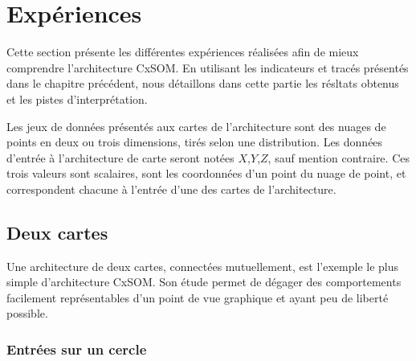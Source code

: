 \chapter{Expériences}
\graphicspath{{04-Analyse/}}

Cette section présente les différentes expériences réalisées afin de mieux comprendre l'architecture CxSOM.
En utilisant les indicateurs et tracés présentés dans le chapitre précédent, nous détaillons dans cette partie les résltats obtenus et les pistes d'interprétation.

Les jeux de données présentés aux cartes de l'architecture sont des nuages de points en deux ou trois dimensions, tirés selon une distribution.
Les données d'entrée à l'architecture de carte seront notées $X$,$Y$,$Z$, sauf mention contraire. Ces trois valeurs sont scalaires, sont les coordonnées d'un point du nuage de point, et correspondent chacune à l'entrée d'une des cartes de l'architecture.

\section{Deux cartes}

Une architecture de deux cartes, connectées mutuellement, est l'exemple le plus simple d'architecture CxSOM. Son étude permet de dégager des comportements facilement représentables d'un point de vue graphique et ayant peu de liberté possible. 


\subsection{Entrées sur un cercle}

